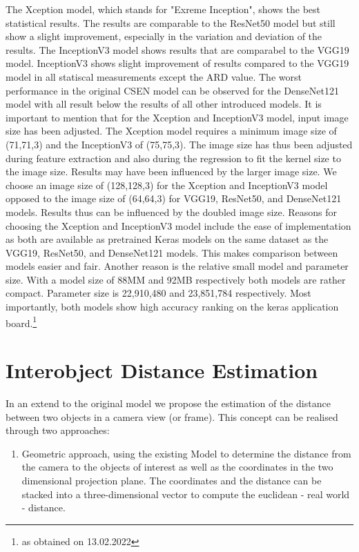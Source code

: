\documentclass[a4paper, 11pt]{article}
\begin{document}
\begin{multicols}{2}
\begin{flushleft}
The Xception model, which stands for "Exreme Inception", shows the best statistical results. The results are comparable to the ResNet50 model but still show a slight improvement, especially in the variation and deviation of the results. The InceptionV3 model shows results that are comparabel to the VGG19 model. InceptionV3 shows slight improvement of results compared to the VGG19 model in all statiscal measurements except the ARD value. The worst performance in the original CSEN model can be observed for the DenseNet121 model with all result below the results of all other introduced models.  
It is important to mention that for the Xception and InceptionV3 model, input image size has been adjusted. The Xception model requires a minimum image size of (71,71,3) and the InceptionV3 of (75,75,3). The image size has thus been adjusted during feature extraction and also during the regression to fit the kernel size to the image size. Results may have been influenced by the larger image size. We choose an image size of (128,128,3) for the Xception and InceptionV3 model opposed to the image size of (64,64,3) for VGG19, ResNet50, and DenseNet121 models. Results thus can be influenced by the doubled image size. 
Reasons for choosing the Xception and InceptionV3 model include the ease of implementation as both are available as pretrained Keras models on the same dataset as the VGG19, ResNet50, and DenseNet121 models. This makes comparison between models easier and fair. 
Another reason is the relative small model and parameter size. With a model size of 88MM and 92MB respectively both models are rather compact. Parameter size is 22,910,480 and 23,851,784 respectively. Most importantly, both models show high accuracy ranking on the keras application board.\footnote{as obtained on 13.02.2022}
\end{flushleft}

\section{Interobject Distance Estimation}
\begin{flushleft}
In an extend to the original model we propose the estimation of the distance between two objects in a camera view (or frame). This concept can be realised through two approaches:
\begin{enumerate}
\item Geometric approach, using the existing Model to determine the distance from the camera to the objects of interest as well as the coordinates in the two dimensional projection plane. The coordinates and the distance can be stacked into a three-dimensional vector to compute the euclidean - real world - distance.


\end{enumerate}
\end{flushleft}
\end{multicols}
\end{document}
